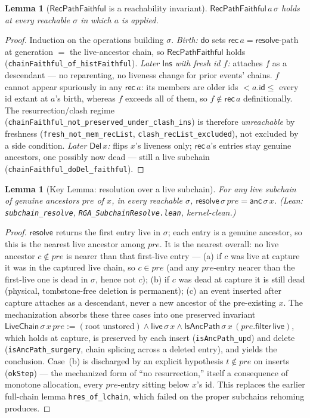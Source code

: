 \documentclass[11pt]{article}
\newtheorem{lemma}[theorem]{Lemma}
\newcommand{\lean}[1]{\texttt{#1}}
\newcommand{\st}{\sigma}
\newcommand{\dodo}{\mathsf{do}}
\newcommand{\resolve}{\mathsf{resolve}}
\newcommand{\anc}{\mathsf{anc}}
\newcommand{\contains}{\mathsf{live}}
\newcommand{\recList}{\mathsf{rec}}
\newcommand{\RVF}{\textsf{RecPathFaithful}}
\begin{document}
\begin{lemma}[$\RVF$ is a reachability invariant]\label{lem:rvf}
$\RVF\,a\,\st$ holds at every reachable $\st$ in which $a$ is applied.
\end{lemma}
\begin{proof}
Induction on the operations building $\st$. \emph{Birth:} $\dodo$ sets
$\recList\,a = \resolve\text{-path}$ at generation $=$ the live-ancestor chain, so $\RVF$
holds (\lean{chainFaithful\_of\_histFaithful}). \emph{Later $\mathsf{Ins}$ with fresh id
$f$:} attaches $f$ as a descendant --- no reparenting, no liveness change for prior events'
chains. $f$ cannot appear spuriously in any $\recList\,a$: its members are older ids
$< a.\mathsf{id} \le$ every id extant at $a$'s birth, whereas $f$ exceeds all of them, so
$f \notin \recList\,a$ definitionally. The resurrection/clash regime
(\lean{chainFaithful\_not\_preserved\_under\_clash\_ins}) is therefore \emph{unreachable} by
freshness (\lean{fresh\_not\_mem\_recList}, \lean{clash\_recList\_excluded}), not excluded by
a side condition. \emph{Later $\mathsf{Del}\,x$:} flips $x$'s liveness only; $\recList\,a$'s
entries stay genuine ancestors, one possibly now dead --- still a live subchain
(\lean{chainFaithful\_doDel\_faithful}).
\end{proof}

\begin{lemma}[Key Lemma: resolution over a live subchain]\label{lem:key}
For any live subchain of genuine ancestors $pre$ of $x$, in every reachable $\st$,
$\resolve\,\st\,pre = \anc\,\st\,x$. (Lean: \lean{subchain\_resolve},
\lean{RGA\_SubchainResolve.lean}, kernel-clean.)
\end{lemma}
\begin{proof}
$\resolve$ returns the first entry live in $\st$; each entry is a genuine ancestor, so this is
the nearest live ancestor among $pre$. It is the nearest overall: no live ancestor $c \notin
pre$ is nearer than that first-live entry --- (a) if $c$ was live at capture it was in the
captured live chain, so $c \in pre$ (and any $pre$-entry nearer than the first-live one is
dead in $\st$, hence not $c$); (b) if $c$ was dead at capture it is still dead (physical,
tombstone-free deletion is permanent); (c) an event inserted after capture attaches as a
descendant, never a new ancestor of the pre-existing $x$. The mechanization absorbs these
three cases into one preserved invariant
$\mathsf{LiveChain}\,\st\,x\,pre := (\text{root unstored}) \wedge \contains\,\st\,x \wedge
\mathsf{IsAncPath}\,\st\,x\,(pre.\mathsf{filter}\,\contains)$, which holds at capture, is
preserved by each insert (\lean{isAncPath\_upd}) and delete (\lean{isAncPath\_surgery}, chain
splicing across a deleted entry), and yields the conclusion. Case~(b) is discharged by an
explicit hypothesis $t \notin pre$ on inserts (\lean{okStep}) --- the mechanized form of ``no
resurrection,'' itself a consequence of monotone allocation, every $pre$-entry sitting below
$x$'s id. This replaces the earlier full-chain lemma \lean{hres\_of\_lchain}, which failed on
the proper subchains rehoming produces.
\end{proof}
\end{document}
